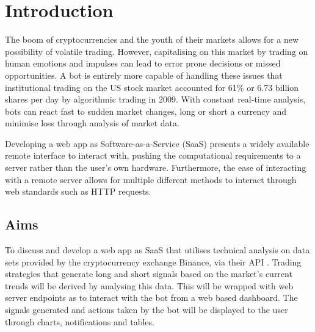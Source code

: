 
\chapter{Introduction}
\label{sec:intro}


The boom of cryptocurrencies and the youth of their markets allows for a new possibility of volatile trading. However, capitalising on this market by trading on human emotions and impulses can lead to error prone decisions or missed opportunities. A bot is entirely more capable of handling these issues that institutional trading on the US stock market accounted for 61\% or 6.73 billion shares \cite{WEB:Cheng:2017} per day by algorithmic trading in 2009. With constant real-time analysis, bots can react fast to sudden market changes, long or short a currency and minimise loss through analysis of market data. 

Developing a web app as Software-as-a-Service (SaaS) presents a widely available remote interface to interact with, pushing the computational requirements to a server rather than the user's own hardware. Furthermore, the ease of interacting with a remote server allows for multiple different methods to interact through web standards such as HTTP requests.






\section{Aims}
\label{sec:intro:aims}
\noindent To discuss and develop a web app as SaaS that utilises technical analysis on data sets provided by the cryptocurrency exchange Binance, via their API \cite{WEB:BINANCE_API:2018}. Trading strategies that generate long and short signals based on the market's current trends will be derived by analysing this data. This will be wrapped with web server endpoints as to interact with the bot from a web based dashboard. The signals generated and actions taken by the bot will be displayed to the user through charts, notifications and tables.


